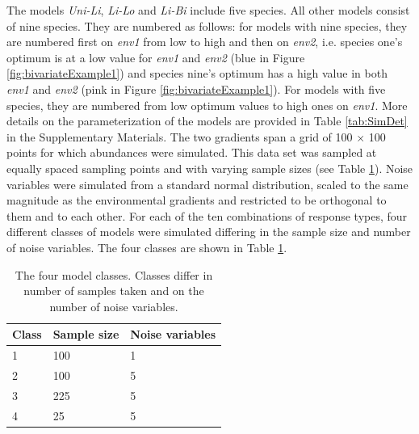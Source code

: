 		The models \textit{Uni-Li}, \textit{Li-Lo} and \textit{Li-Bi} include five species.
		All other models consist of nine species.
		They are numbered as follows: for models with nine species, they are numbered first on \textit{env1} from low to high and then on \textit{env2}, i.e. species one's optimum is at a low value for \textit{env1} and \textit{env2} (blue in Figure \ref{fig:bivariateExample1}) and species nine's optimum has a high value in both \textit{env1} and \textit{env2} (pink in Figure \ref{fig:bivariateExample1}). 
		For models with five species, they are numbered from low optimum values to high ones on \textit{env1}.
		More details on the parameterization of the models are provided in Table \ref{tab:SimDet} in the Supplementary Materials.
		The two gradients span a grid of 100 $\times$ 100 points for which abundances were simulated. 
		This data set was sampled at equally spaced sampling points and with varying sample sizes (see Table \ref{table:classes}). 
		Noise variables were simulated from a standard normal distribution, scaled to the same magnitude as the environmental gradients and restricted to be orthogonal to them and to each other.  
		For each of the ten combinations of response types, four different classes of models were simulated differing in the sample size and number of noise variables. 
		The four classes are shown in Table \ref{table:classes}. \\
	
		\begin{table}[h!]
			\begin{center}
			
				\caption{The four model classes. Classes differ in number of samples taken and on the number of noise variables.}
				\begin{tabular}{@{}lll@{}}
					
					\toprule
					 Class & Sample size & Noise variables  \\
					\hline
					1 & 100 & 1 \\
					2 & 100 & 5 \\
					3 & 225 & 5 \\
					4 & 25  & 5 \\	
					\bottomrule
				\end{tabular}
				
				\label{table:classes}
			\end{center}
		\end{table}
	
